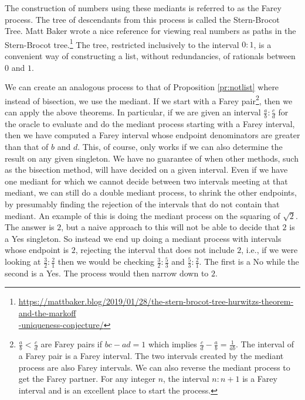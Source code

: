 \documentclass[12pt]{article}
\begin{document}
The construction of numbers using these mediants is referred to as the Farey process. The tree of descendants from this process is called the Stern-Brocot Tree. Matt Baker wrote a nice reference for viewing real numbers as paths in the Stern-Brocot tree.\footnote{{\href{https://mattbaker.blog/2019/01/28/the-stern-brocot-tree-hurwitzs-theorem-and-the-markoff-uniqueness-conjecture/}{https://mattbaker.blog/2019/01/28/the-stern-brocot-tree-hurwitzs-theorem-and-the-markoff} \\ \hspace*{10px}  \href{https://mattbaker.blog/2019/01/28/the-stern-brocot-tree-hurwitzs-theorem-and-the-markoff-uniqueness-conjecture/}{-uniqueness-conjecture/} }} The tree, restricted inclusively to the interval $0:1$, is a convenient way of constructing a list, without redundancies, of rationals between $0$ and $1$. 

We can create an analogous process to that of Proposition \ref{pr:notlist} where instead of bisection, we use the mediant. If we start with a Farey pair\footnote{$\frac{a}{b} < \frac{c}{d}$ are Farey pairs if $bc-ad=1$ which implies $\frac{c}{d} - \frac{a}{b} = \frac{1}{ab}$. The interval of a Farey pair is a Farey interval. The two intervals created by the mediant process are also Farey intervals. We can also reverse the mediant process to get the Farey partner. For any integer $n$, the interval $n:n+1$ is a Farey interval and is an excellent place to start the process.}, then we can apply the above theorems. In particular, if we are given an interval $\frac{a}{b} : \frac{c}{d}$ for the oracle to evaluate and do the mediant process starting with a Farey interval, then we have computed a Farey interval whose endpoint denominators are greater than that of $b$ and $d$. This, of course, only works if we can also determine the result on any given singleton. We have no guarantee of when other methods, such as the bisection method, will have decided on a given interval. Even if we have one mediant for which we cannot decide between two intervals meeting at that mediant, we can still do a double mediant process, to shrink the other endpoints, by presumably finding the rejection of the intervals that do not contain that mediant. An example of this is doing the mediant process on the squaring of $\sqrt{2}$. The answer is $2$, but a naive approach to this will not be able to decide that $2$ is a Yes singleton. So instead we end up doing a mediant process with intervals whose endpoint is $2$, rejecting the interval that does not include $2$, i.e.,  if we were looking at $\frac{3}{2}:\frac{2}{1}$ then we would be checking $\frac{3}{2}:\frac{5}{3}$ and $\frac{5}{3}:\frac{2}{1}$. The first is a No while the second is a Yes. The process would then narrow down to $2$. 
\end{document}

